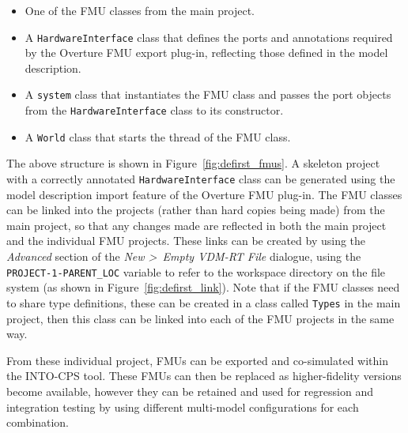 \begin{itemize}[noitemsep]
\item One of the FMU classes from the main project.
\item A \texttt{HardwareInterface} class that defines the ports and annotations required by the Overture FMU export plug-in, reflecting those defined in the model description.
\item A \texttt{system} class that instantiates the FMU class and passes the port objects from the \texttt{HardwareInterface} class to its constructor.
\item A \texttt{World} class that starts the thread of the FMU class.
\end{itemize}

The above structure is shown in Figure~\ref{fig:defirst_fmus}. A skeleton project with a correctly annotated \texttt{HardwareInterface} class can be generated using the model description import feature of the Overture FMU plug-in. The FMU classes can be linked into the projects (rather than hard copies being made) from the main project, so that any changes made are reflected in both the main project and the individual FMU projects. These links can be created by using the \emph{Advanced} section of the \emph{New \textgreater\ Empty VDM-RT File} dialogue, using the \texttt{PROJECT-1-PARENT\_LOC} variable to refer to the workspace directory on the file system (as shown in Figure~\ref{fig:defirst_link}). Note that if the FMU classes need to share type definitions, these can be created in a class called \texttt{Types} in the main project, then this class can be linked into each of the FMU projects in the same way.

From these individual project, FMUs can be exported and co-simulated within the INTO-CPS tool. These FMUs can then be replaced as higher-fidelity versions become available, however they can be retained and used for regression and integration testing by using different multi-model configurations for each combination.

